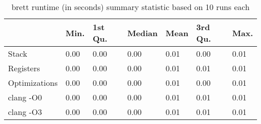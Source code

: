 \begin{table}[h!]
\centering
\begin{tabular}{p{}p{}p{}p{}p{}p{}p{}}
  \hline
 & Min. & 1st Qu. & Median & Mean & 3rd Qu. & Max. \\ 
  \hline
Stack & 0.00 & 0.00 & 0.00 & 0.01 & 0.00 & 0.01 \\ 
  Registers & 0.00 & 0.00 & 0.00 & 0.01 & 0.01 & 0.01 \\ 
  Optimizations & 0.00 & 0.00 & 0.00 & 0.01 & 0.00 & 0.01 \\ 
  clang -O0 & 0.00 & 0.00 & 0.00 & 0.01 & 0.01 & 0.01 \\ 
  clang -O3 & 0.00 & 0.00 & 0.00 & 0.01 & 0.01 & 0.01 \\ 
   \hline
\end{tabular}
\caption{brett runtime (in seconds) summary statistic based on 10 runs each}
\end{table}
